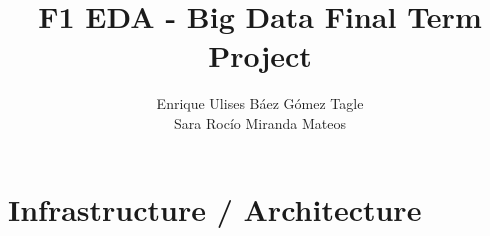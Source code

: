 \documentclass{article}
\begin{document}
\title{F1 EDA - Big Data Final Term Project}

\author{Enrique Ulises Báez Gómez Tagle \\ Sara Rocío Miranda Mateos}

\maketitle



\tableofcontents
\newpage



\section{Infrastructure / Architecture}
\end{document}
